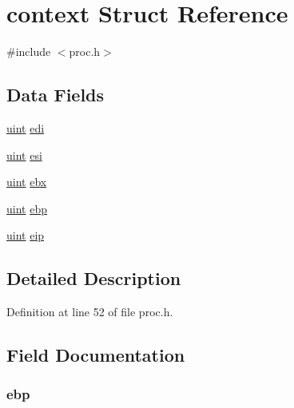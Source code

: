 \hypertarget{structcontext}{\section{context Struct Reference}
\label{structcontext}
}


{\ttfamily \#include $<$proc.\-h$>$}

\subsection*{Data Fields}
\begin{DoxyCompactItemize}
\item 
\hyperlink{types_8h_a91ad9478d81a7aaf2593e8d9c3d06a14}{uint} \hyperlink{structcontext_a5d017b35dd2b40671e27c7ae6c276b23}{edi}
\item 
\hyperlink{types_8h_a91ad9478d81a7aaf2593e8d9c3d06a14}{uint} \hyperlink{structcontext_ab40e0917bb6e7e462049fc4151201f0a}{esi}
\item 
\hyperlink{types_8h_a91ad9478d81a7aaf2593e8d9c3d06a14}{uint} \hyperlink{structcontext_a685d686dce7abed5d536f3304c4692b9}{ebx}
\item 
\hyperlink{types_8h_a91ad9478d81a7aaf2593e8d9c3d06a14}{uint} \hyperlink{structcontext_a8d9d61f0e845561448cf50ddf637e6b3}{ebp}
\item 
\hyperlink{types_8h_a91ad9478d81a7aaf2593e8d9c3d06a14}{uint} \hyperlink{structcontext_ae590d07d633d3642402cd0b25e053568}{eip}
\end{DoxyCompactItemize}


\subsection{Detailed Description}


Definition at line 52 of file proc.\-h.



\subsection{Field Documentation}
\hypertarget{structcontext_a8d9d61f0e845561448cf50ddf637e6b3}{
\subsubsection[{ebp}]{ ebp}}\label{structcontext_a8d9d61f0e845561448cf50ddf637e6b3}


